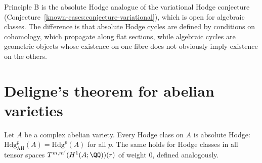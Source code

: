 \begin{remark}\label{absolute-hodge:remark-variational}
Principle B is the absolute Hodge analogue of the variational Hodge conjecture (Conjecture~\ref{known-cases:conjecture-variational}), which is open for algebraic classes. The difference is that absolute Hodge
cycles are defined by conditions on cohomology, which propagate along flat sections, while algebraic cycles are geometric objects whose existence on one fibre does not obviously imply existence on the
others.
\end{remark}

\section{Deligne's theorem for abelian varieties}\label{absolute-hodge:section-deligne}

\begin{theorem}[Deligne]\label{absolute-hodge:theorem-deligne}
Let $A$ be a complex abelian variety. Every Hodge class on $A$ is absolute Hodge: $\mathrm{Hdg}^p_{\mathrm{AH}}(A) = \mathrm{Hdg}^p(A)$ for all $p$. The same holds for Hodge classes in all tensor spaces
$T^{m,m'}(H^1(A; \QQ))(r)$ of weight $0$, defined analogously.
\end{theorem}

